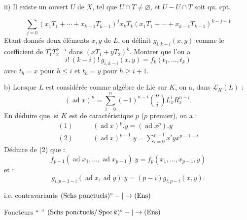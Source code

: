ii) Il existe un ouvert  $U$ de $X$, tel que
$U\cap T\ne\varnothing$, et $U-U\cap T$ soit qu. cpt.


\[
\sum_{j=0}(x_1T_1+\cdots+x_{k-1}T_{k-1})^j x_kT_k
(x_1T_1+\cdots+x_{k-1}T_{k-1})^{k-j-1}
\]
Etant donnés deux éléments $x,y$ de $L$, on définit $g_{i,k-i}(x,y)$ comme
le coefficient de $T_1^iT_2^{k-i}$ dans $(xT_1+yT_2)^k$.
Montrer que l'on a
\[
i!\ (k-i)!\ g_{i,k-i}(x,y)=f_k(t_1,\ldots,t_k)
\]
avec $t_h=x$ pour $h\leq i$ et $t_h=y$ pour $h\geq i+1$.

b) Lorsque $L$ est considérée comme algèbre de Lie sur $K$, on a, dans
$\mathcal L_K(L)$ :
\[
(\operatorname{ad}x)^n=\sum_{i=0}^n(-1)^{n-i}\binom ni L_x^i R_x^{n-i}.
\]
En déduire que, si $K$ est de caractéristique $p$ ($p$ premier), on a :
\[
\begin{aligned}
(1)\qquad &(\operatorname{ad}x)^p.y=(\operatorname{ad}x^p).y\\
(2)\qquad &(\operatorname{ad}x)^{p-1}.y=\sum_{i=0}^{p-1}x^iyx^{p-1-i}
\end{aligned}
\]
Déduire de (2) que :
\[
f_{p-1}(\operatorname{ad}x_1,\ldots,\operatorname{ad}x_{p-1}).y
=f_p(x_1,\ldots,x_{p-1},y)
\]
et :
\[
g_{i,p-1-i}(\operatorname{ad}x,\operatorname{ad}y).y
=(p-i)g_{i,p-i}(x,y).
\]

i.e. contravariants $(\text{Schs ponctuels})^\circ-|\to(\mathrm{Ens})$

Foncteurs `` '' $(\text{Schs ponctuels}/\operatorname{Spec}k)^\circ-|\to(\mathrm{Ens})$

